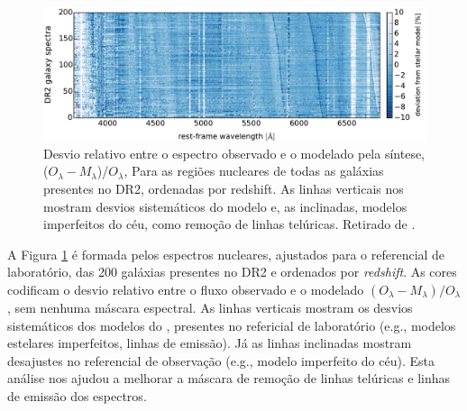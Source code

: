 \begin{figure}
	\centering
	\includegraphics[scale=0.5]{figuras/DR2_stacked_residuals.pdf}
	\caption[DR2: Espectros residuais nucleares]
	{Desvio relativo entre o espectro observado e o modelado pela síntese, ($O_\lambda - M_\lambda$)/$O_\lambda$, Para as regiões nucleares de todas as galáxias presentes no DR2, ordenadas por redshift. As linhas verticais nos mostram desvios sistemáticos do modelo e, as inclinadas, modelos imperfeitos do céu, como remoção de linhas telúricas. Retirado de \citet{GarciaBenito.etal.2015a}.}
	\label{fig:fnuc_stack}
\end{figure}

A Figura \ref{fig:fnuc_stack} é formada pelos espectros nucleares, ajustados para o referencial de laboratório, das 200 galáxias presentes no DR2 e ordenados por {\em redshift}. As cores codificam o desvio relativo entre o fluxo observado e o modelado $(O_\lambda - M_\lambda)/O_\lambda$, sem nenhuma máscara espectral. As linhas verticais mostram os desvios sistemáticos dos modelos do \starlight, presentes no refericial de laboratório (e.g., modelos estelares imperfeitos, linhas de emissão). Já as linhas inclinadas mostram desajustes no referencial de observação (e.g., modelo imperfeito do céu). Esta análise nos ajudou a melhorar a máscara de remoção de linhas telúricas e linhas de emissão dos espectros.


